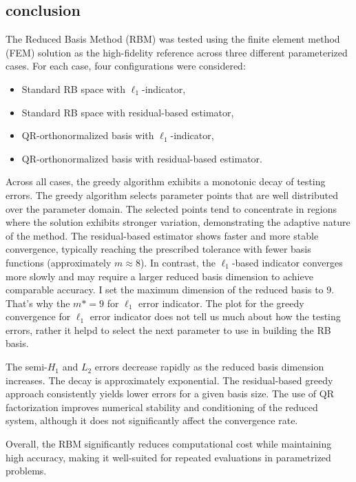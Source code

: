 \documentclass[11pt]{article}      %
\begin{document}
\begin{enumerate}
\section*{conclusion}
The Reduced Basis Method (RBM) was tested using the finite element method (FEM) solution as the high-fidelity reference across three different parameterized cases. For each case, four configurations were considered:
\begin{itemize}
	\item Standard RB space with $\ell_1$-indicator,
	\item Standard RB space with residual-based estimator,
	\item QR-orthonormalized basis with $\ell_1$-indicator,
	\item QR-orthonormalized basis with residual-based estimator.
\end{itemize}
Across all cases, the greedy algorithm exhibits a monotonic decay of testing errors. The greedy algorithm selects parameter points that are well distributed over the parameter domain. The selected points tend to concentrate in regions where the solution exhibits stronger variation, demonstrating the adaptive nature of the method.
The residual-based estimator shows faster and more stable convergence, typically reaching the prescribed tolerance with fewer basis functions (approximately $m \approx 8$). In contrast, the $\ell_1$-based indicator converges more slowly and may require a larger reduced basis dimension to achieve comparable accuracy. I set the maximum dimension of the reduced basis to 9. That's why the $m*=9$ for $\ell_1$ error indicator. The plot for the greedy convergence for $\ell_1$ error indicator does not tell us much about how the testing errors, rather it helpd to select the next parameter to use in building the RB basis.

The semi-$H_1$ and $L_2$ errors decrease rapidly as the reduced basis dimension increases. The decay is approximately exponential.
The residual-based greedy approach consistently yields lower errors for a given basis size. The use of QR factorization improves numerical stability and conditioning of the reduced system, although it does not significantly affect the convergence rate.

Overall, the RBM significantly reduces computational cost while maintaining high accuracy, making it well-suited for repeated evaluations in parametrized problems.
\end{enumerate}

\end{document}

